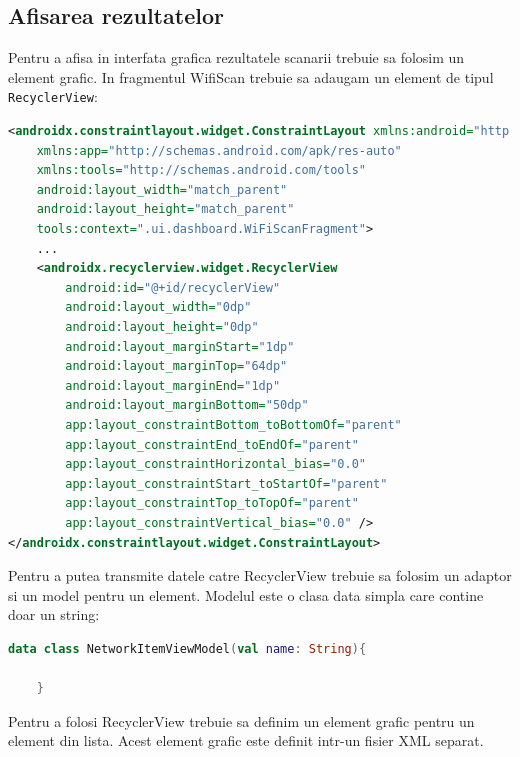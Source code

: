 \subsection{Afisarea rezultatelor}
Pentru a afisa in interfata grafica rezultatele scanarii trebuie sa folosim un element grafic.
In fragmentul {WifiScan} trebuie sa adaugam un element de tipul \texttt{RecyclerView}:
\begin{lstlisting}[language=XML]
<androidx.constraintlayout.widget.ConstraintLayout xmlns:android="http://schemas.android.com/apk/res/android"
    xmlns:app="http://schemas.android.com/apk/res-auto"
    xmlns:tools="http://schemas.android.com/tools"
    android:layout_width="match_parent"
    android:layout_height="match_parent"
    tools:context=".ui.dashboard.WiFiScanFragment">
    ...
    <androidx.recyclerview.widget.RecyclerView
        android:id="@+id/recyclerView"
        android:layout_width="0dp"
        android:layout_height="0dp"
        android:layout_marginStart="1dp"
        android:layout_marginTop="64dp"
        android:layout_marginEnd="1dp"
        android:layout_marginBottom="50dp"
        app:layout_constraintBottom_toBottomOf="parent"
        app:layout_constraintEnd_toEndOf="parent"
        app:layout_constraintHorizontal_bias="0.0"
        app:layout_constraintStart_toStartOf="parent"
        app:layout_constraintTop_toTopOf="parent"
        app:layout_constraintVertical_bias="0.0" />
</androidx.constraintlayout.widget.ConstraintLayout>
\end{lstlisting}
Pentru a putea transmite datele catre RecyclerView trebuie sa folosim un adaptor si un model pentru un element.
Modelul este o clasa data simpla care contine doar un string:
\begin{lstlisting}[language=Kotlin]
    data class NetworkItemViewModel(val name: String){

    }
\end{lstlisting}
Pentru a folosi RecyclerView trebuie sa definim un element grafic pentru un element din lista.
Acest element grafic este definit intr-un fisier XML separat.
